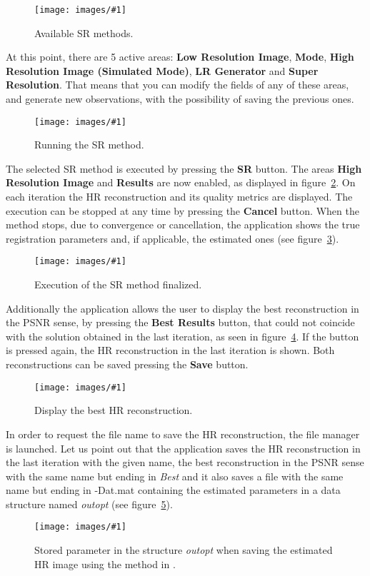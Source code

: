 \documentclass[11pt,a4paper]{article}
\newcommand{\figureimage}[4]{%
\begin{figure}[t]%
\begin{center}%
\texttt{[image: images/\#1]}%
\caption{#4}%
\label{#3}%
\end{center}%
\end{figure}%
} %
\begin{document}
\figureimage{s8nw}{width=0.75\textwidth}{fig:ap01s8}%
 {Available SR methods.} 

At this point, there are 5 active areas: \textbf{Low Resolution Image}, \textbf{Mode}, \textbf{High Resolution Image (Simulated Mode)}, \textbf{LR Generator} and \textbf{Super Resolution}. That means that you can modify the fields of any of these areas, and generate new observations, with the possibility of saving the previous ones.

\figureimage{s9}{width=\textwidth}{fig:ap01s9}%
 {Running the SR method.} 

The selected SR method is executed by pressing the \textbf{SR} button. The areas \textbf{High Resolution Image} and \textbf{Results} are now enabled, as displayed in figure~\ref{fig:ap01s9}. On each iteration the HR reconstruction and its  quality metrics are displayed. The execution can be stopped at any time by pressing the \textbf{Cancel} button. When the method stops, due to convergence or cancellation, the application shows the true registration parameters and, if applicable, the estimated ones (see figure~\ref{fig:ap01s10}).
 
\figureimage{s10}{width=\textwidth}{fig:ap01s10}%
 {Execution of the SR method finalized.} 
 
Additionally the application allows the user to display the best reconstruction in the PSNR sense, by pressing the \textbf{Best Results} button, that could not coincide with the solution obtained in the last iteration, as seen in figure~\ref{fig:ap01s11}. If the button is pressed again, the HR reconstruction in the last iteration is shown. Both reconstructions can be saved pressing the \textbf{Save} button. 

\figureimage{s11}{width=\textwidth}{fig:ap01s11}%
 {Display the best HR reconstruction.} 
 
In order to request the file name to save the HR reconstruction, the file manager is launched. Let us point out that the application saves the HR reconstruction in the last iteration with the given name, the best reconstruction in the PSNR sense with the same name but ending in \emph{Best} and it also saves a file with the same name but ending in -Dat.mat containing the estimated parameters in a data structure named \textit{outopt} (see figure~\ref{fig:ap01dat01}). 
 
 \figureimage{dat01}{width=0.75\textwidth}{fig:ap01dat01}%
 {Stored parameter in the structure \textit{outopt} when saving the estimated HR image using the method in  \cite{Villena:09}.}
\end{document}
